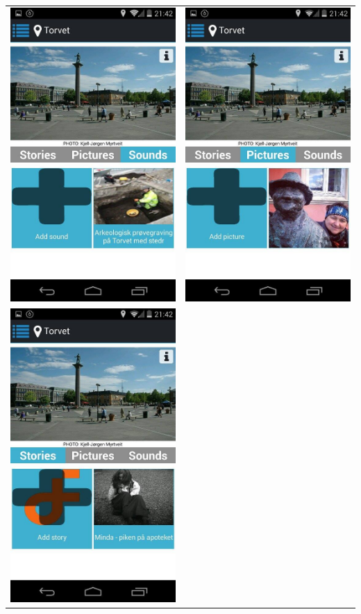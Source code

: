 \documentclass[12pt,a4paper,titlepage]{article}
\begin{document}
\begin{center}
\begin{tabular}{cc}
	 	\includegraphics[width=0.35 \textwidth]{res/ScreenShot5.jpg}	& 	
	 	\includegraphics[width=0.35 \textwidth]{res/ScreenShot6.jpg}\\
	 	\includegraphics[width=0.35 \textwidth]{res/ScreenShot7.jpg}	&

\end{tabular}
\end{center}
\end{document}
